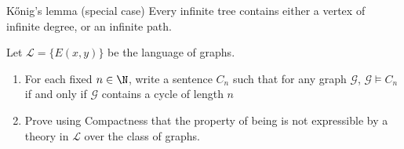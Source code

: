 \documentclass[a4paper, 12pt]{report}
\begin{document}
    \begin{framedlem}{Kőnig's lemma (special case)}
        Every infinite tree contains either a vertex of infinite degree, or an infinite path.
    \end{framedlem}

    \newpage

    \begin{framedprob}{}
    \end{framedprob}

    \begin{framedprob}{}
    \end{framedprob}

    \begin{framedprob}{}
    \end{framedprob}

    \newpage

    \begin{framedprob}{}
        Let $\mathcal L = \{E(x, y)\}$ be the language of graphs.

        \begin{enumerate}
            \item For each fixed $n \in \N$, write a sentence $C_n$ such that for any graph $\mathcal G$, $\mathcal G \models C_n$ if and only if $\mathcal G$ contains a cycle of length $n$
            \item Prove using Compactness that the property of being  is not expressible by a theory in $\mathcal L$ over the class of graphs.
        \end{enumerate}
    \end{framedprob}
\end{document}
